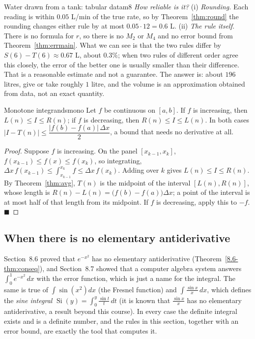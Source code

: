 \documentclass[11pt]{article}
\begin{document}
\begin{exmp}{Water drawn from a tank: tabular data}{m8}
\emph{How reliable is it?} (i) \emph{Rounding.} Each reading is within $0.05$ L/min of the true rate, so by Theorem~\ref{thm:round} the rounding changes either rule by at most $0.05\cdot12=0.6$ L. (ii) \emph{The rule itself.} There is no formula for $r$, so there is no $M_2$ or $M_4$ and no error bound from Theorem~\ref{thm:errmain}. What we can see is that the two rules differ by $S(6)-T(6)\approx0.67$ L, about $0.3\%$; when two rules of different order agree this closely, the error of the better one is usually smaller than their difference. That is a reasonable estimate and not a guarantee. The answer is: about $196$ litres, give or take roughly $1$ litre, and the volume is an approximation obtained from data, not an exact quantity.
\end{exmp}


\begin{thm}{Monotone integrands}{mono}
Let $f$ be continuous on $[a,b]$. If $f$ is increasing, then $L(n)\le I\le R(n)$; if $f$ is decreasing, then $R(n)\le I\le L(n)$. In both cases $\lvert I-T(n)\rvert\le\dfrac{\lvert f(b)-f(a)\rvert\,\Delta x}2$, a bound that needs no derivative at all.
\end{thm}
\begin{proof}
Suppose $f$ is increasing. On the panel $[x_{k-1},x_k]$, $f(x_{k-1})\le f(x)\le f(x_k)$, so integrating, $\Delta x\,f(x_{k-1})\le\int_{x_{k-1}}^{x_k}f\le\Delta x\,f(x_k)$. Adding over $k$ gives $L(n)\le I\le R(n)$. By Theorem~\ref{thm:avg}, $T(n)$ is the midpoint of the interval $[L(n),R(n)]$, whose length is $R(n)-L(n)=\big(f(b)-f(a)\big)\Delta x$; a point of the interval is at most half of that length from its midpoint. If $f$ is decreasing, apply this to $-f$. $\blacksquare$
\end{proof}

\subsection*{When there is no elementary antiderivative}

Section~8.6 proved that $e^{-x^2}$ has no elementary antiderivative (Theorem~\ref{8.6-thm:conseq}), and Section~8.7 showed that a computer algebra system answers $\int_0^1e^{-x^2}\,dx$ with the error function, which is just a name for the integral. The same is true of $\int\sin\left(x^2\right)dx$ (the Fresnel function) and $\int\frac{\sin x}x\,dx$, which defines the \emph{sine integral} $\operatorname{Si}(y)=\int_0^y\frac{\sin t}t\,dt$ (it is known that $\frac{\sin x}x$ has no elementary antiderivative, a result beyond this course). In every case the definite integral exists and is a definite number, and the rules in this section, together with an error bound, are exactly the tool that computes it.
\end{document}

